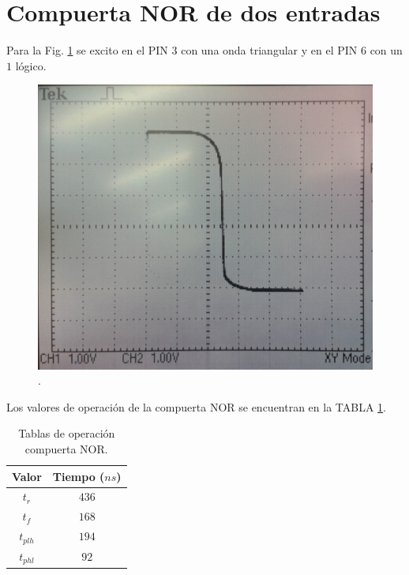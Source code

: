 \documentclass[twocolumn]{IEEEtran}
\begin{document}
\section{Compuerta NOR de dos entradas}
\noindent
Para la Fig. \ref{fig7} se excito en el PIN $3$ con una onda triangular y en el PIN $6$ con un $1$ lógico.
\begin{figure}[H]
\centering
	\includegraphics[scale=0.1]{f2.jpg}
	\caption{.}
	\label{fig7}
\end{figure}
\noindent
Los valores de operación de la compuerta NOR se encuentran en la TABLA \ref{tab6}.
\begin{table}[H]
  \centering
    \caption{Tablas de operación compuerta NOR.}
      \begin{tabular}{|c|c|}\hline
      \textbf{Valor} & \multicolumn{1}{l|}{\textbf{Tiempo ($ns$)}} \\ \hline
      $t_r$ & $436$ \\ \hline
      $t_f$ & $168$ \\ \hline
      $t_{plh}$ & $194$ \\ \hline
      $t_{phl}$ & $92$ \\ \hline
      \end{tabular}
  \label{tab6}
\end{table}
\end{document}

